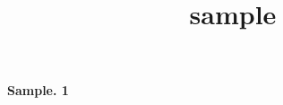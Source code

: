 \documentclass[dvipdfmx]{article}
\title{sample}
\begin{document}
\begin{itembox}[l]{\textbf{Sample. 1}}
    \begin{center}
        \scalebox{1}{}
    \end{center}
    \vspace{1em}
    \begin{center}
        \scalebox{1}{}
    \end{center}
    \vspace{1em}
    \begin{center}
        \scalebox{1}{}
    \end{center}
    \vspace{1em}
    \begin{center}
        \scalebox{1}{}
    \end{center}
\end{itembox}
\end{document}
